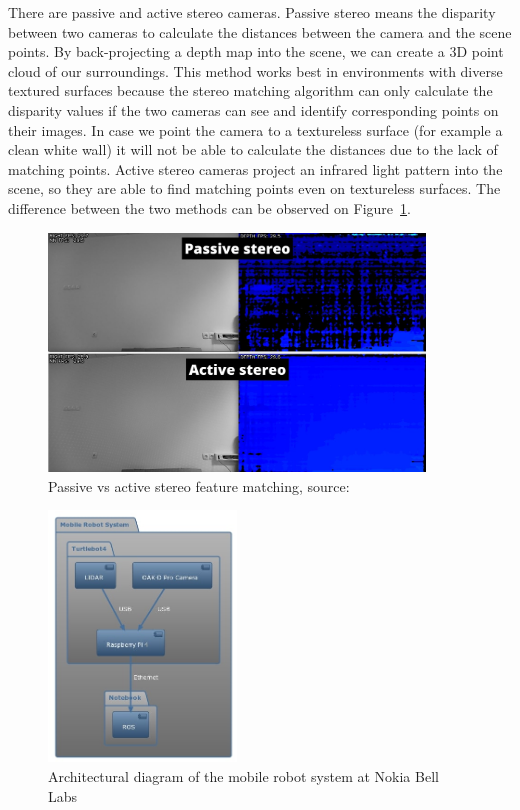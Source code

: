 There are passive and active stereo cameras.
Passive stereo means the disparity between two cameras to calculate the distances between the camera and the scene points. By back-projecting a depth map into the scene, we can create a 3D point cloud of our surroundings. This method works best in environments with diverse textured surfaces because the stereo matching algorithm can only calculate the disparity values if the two cameras can see and identify corresponding points on their images. In case we point the camera to a textureless surface (for example a clean white wall) it will not be able to calculate the distances due to the lack of matching points. 
Active stereo cameras project an infrared light pattern into the scene, so they are able to find matching points even on textureless surfaces. The difference between the two methods can be observed on Figure~\ref{fig:active-passive-stereo}.

\begin{figure}[htbp]
    \centering
    \includegraphics[width=100mm, keepaspectratio]{figures_jpg/active-vs-passive-stereo.jpg}
    \caption{Passive vs active stereo feature matching, source:\cite{ActivePassiveStereo}}
    \label{fig:active-passive-stereo}
\end{figure}

\begin{figure}[htbp]
    \centering
    \includegraphics[width=50mm, keepaspectratio]{figures_jpg/turtlebot4_architecture.jpg}
    \caption{Architectural diagram of the mobile robot system at Nokia Bell Labs}
    \label{fig:mobile_robot_architecture}
\end{figure}

